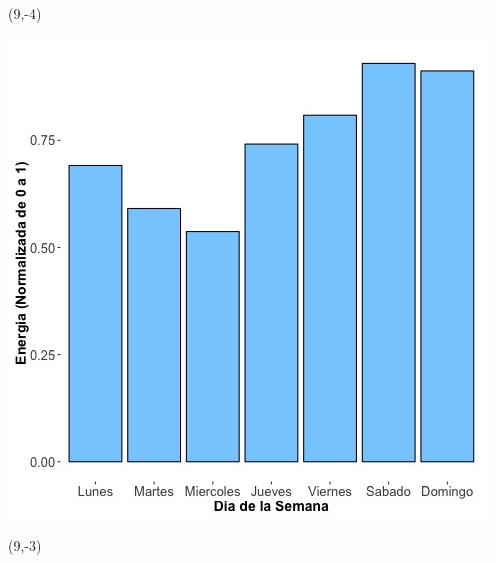 \documentclass{article}\usepackage[]{graphicx}\usepackage[]{color}
\newenvironment{knitrout}{}{} %
\begin{document}
 \begin{textblock}{1}(9,-4)
\begin{minipage}{20em}
\begingroup

\endgroup
\end{minipage}
\end{textblock}


\begin{knitrout}
\color{fgcolor}
\includegraphics[scale=0.65]{figure/A11_day_of_week_plot} 
\end{knitrout}


 \begin{textblock}{1}(9,-3)
\begin{minipage}{20em}
\begingroup

\endgroup
\end{minipage}
\end{textblock}
\end{document}

